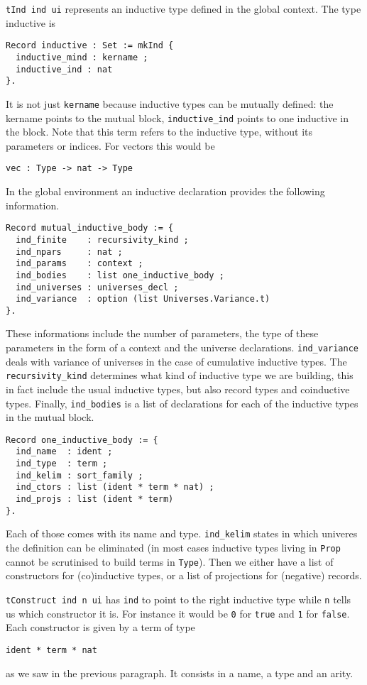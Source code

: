 \texttt{tInd ind ui} represents an inductive type defined in the global
context. The type inductive is
\begin{verbatim}
Record inductive : Set := mkInd {
  inductive_mind : kername ;
  inductive_ind : nat
}.
\end{verbatim}
It is not just \texttt{kername} because inductive types can be mutually
defined: the kername points to the mutual block, \texttt{inductive_ind}
points to one inductive in the block. Note that this term refers to the
inductive type, without its parameters or indices. For vectors this would be
\begin{verbatim}
vec : Type -> nat -> Type
\end{verbatim}
In the global environment an inductive declaration provides the following
information.
\begin{verbatim}
Record mutual_inductive_body := {
  ind_finite    : recursivity_kind ;
  ind_npars     : nat ;
  ind_params    : context ;
  ind_bodies    : list one_inductive_body ;
  ind_universes : universes_decl ;
  ind_variance  : option (list Universes.Variance.t)
}.
\end{verbatim}
These informations include the number of parameters, the type of these
parameters in the form of a context and the universe declarations.
\texttt{ind_variance} deals with variance of universes in the case
of cumulative inductive types.
The \texttt{recursivity_kind} determines what kind of inductive type
we are building, this in fact include the usual inductive types, but also
record types and coinductive types.
Finally, \texttt{ind_bodies} is a list of declarations for each of
the inductive types in the mutual block.
\begin{verbatim}
Record one_inductive_body := {
  ind_name  : ident ;
  ind_type  : term ;
  ind_kelim : sort_family ;
  ind_ctors : list (ident * term * nat) ;
  ind_projs : list (ident * term)
}.
\end{verbatim}
Each of those comes with its name and type.
\texttt{ind_kelim} states in which univeres the definition can be
eliminated (in most cases inductive types living in \texttt{Prop}
cannot be scrutinised to build terms in \texttt{Type}).
Then we either have a list of constructors for (co)inductive types, or a list
of projections for (negative) records.


\texttt{tConstruct ind n ui} has \texttt{ind} to point to the
right inductive type while \texttt{n} tells us which constructor it is.
For instance it would be \texttt{0} for \texttt{true} and
\texttt{1} for \texttt{false}.
Each constructor is given by a term of type
\begin{verbatim}
ident * term * nat
\end{verbatim}
as we saw in the previous paragraph. It consists in a name, a type and an arity.

